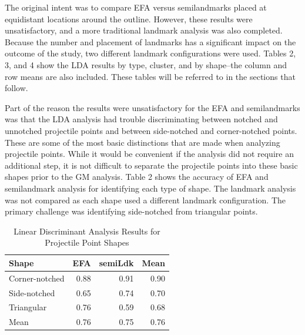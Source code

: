 \documentclass[a4paper]{article}
\begin{document}
The original intent was to compare EFA versus semilandmarks placed at equidistant locations around the outline. However, these results were unsatisfactory, and a more traditional landmark analysis was also completed. Because the number and placement of landmarks has a significant impact on the outcome of the study, two different landmark configurations were used. Tables 2, 3, and 4 show the LDA results by type, cluster, and by shape--the column and row means are also included. These tables will be referred to in the sections that follow.

Part of the reason the results were unsatisfactory for the EFA and semilandmarks was that the LDA analysis had trouble discriminating between notched and unnotched projectile points and between side-notched and corner-notched points. These are some of the most basic distinctions that are made when analyzing projectile points. While it would be convenient if the analysis did not require an additional step, it is not difficult to separate the projectile points into these basic shapes prior to the GM analysis. Table 2 shows the accuracy of EFA and semilandmark analysis for identifying each type of shape. The landmark analysis was not compared as each shape used a different landmark configuration. The primary challenge was identifying side-notched from triangular points.

\begin{table}

\caption{\label{tab:LDAResultsShape}Linear Discriminant Analysis Results for Projectile Point Shapes}
\centering
\begin{tabular}[t]{lrrr}
\toprule
Shape & EFA & semiLdk & Mean\\
\midrule
Corner-notched & 0.88 & 0.91 & 0.90\\
Side-notched & 0.65 & 0.74 & 0.70\\
Triangular & 0.76 & 0.59 & 0.68\\
Mean & 0.76 & 0.75 & 0.76\\
\bottomrule
\end{tabular}
\end{table}
\end{document}
